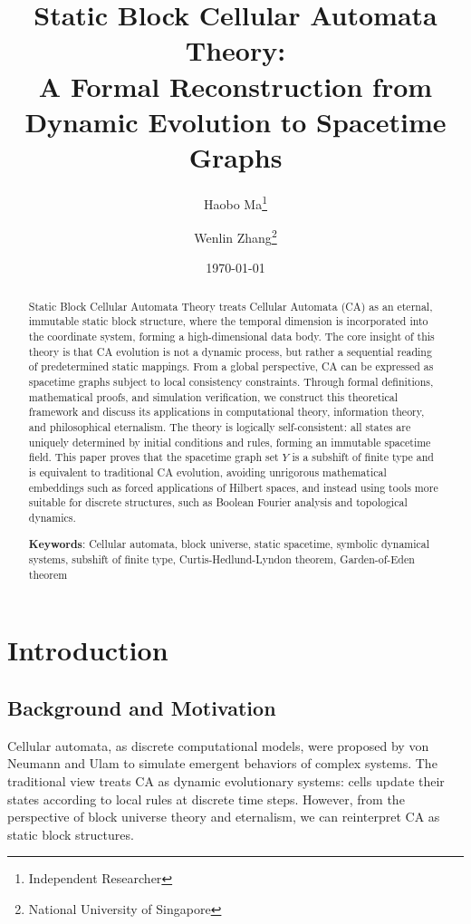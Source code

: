 \documentclass[11pt]{article}
\title{Static Block Cellular Automata Theory:\\ A Formal Reconstruction from Dynamic Evolution to Spacetime Graphs}
\author{Haobo Ma\thanks{Independent Researcher} \and Wenlin Zhang\thanks{National University of Singapore}}
\date{\today}
\theoremstyle{definition}
\theoremstyle{remark}
\begin{document}
\maketitle

\begin{abstract}
Static Block Cellular Automata Theory treats Cellular Automata (CA) as an eternal, immutable static block structure, where the temporal dimension is incorporated into the coordinate system, forming a high-dimensional data body. The core insight of this theory is that CA evolution is not a dynamic process, but rather a sequential reading of predetermined static mappings. From a global perspective, CA can be expressed as spacetime graphs subject to local consistency constraints. Through formal definitions, mathematical proofs, and simulation verification, we construct this theoretical framework and discuss its applications in computational theory, information theory, and philosophical eternalism. The theory is logically self-consistent: all states are uniquely determined by initial conditions and rules, forming an immutable spacetime field. This paper proves that the spacetime graph set \( Y \) is a subshift of finite type and is equivalent to traditional CA evolution, avoiding unrigorous mathematical embeddings such as forced applications of Hilbert spaces, and instead using tools more suitable for discrete structures, such as Boolean Fourier analysis and topological dynamics.

\noindent\textbf{Keywords}: Cellular automata, block universe, static spacetime, symbolic dynamical systems, subshift of finite type, Curtis-Hedlund-Lyndon theorem, Garden-of-Eden theorem
\end{abstract}

\section{Introduction}

\subsection{Background and Motivation}

Cellular automata, as discrete computational models, were proposed by von Neumann and Ulam to simulate emergent behaviors of complex systems. The traditional view treats CA as dynamic evolutionary systems: cells update their states according to local rules at discrete time steps. However, from the perspective of block universe theory and eternalism, we can reinterpret CA as static block structures.
\end{document}
